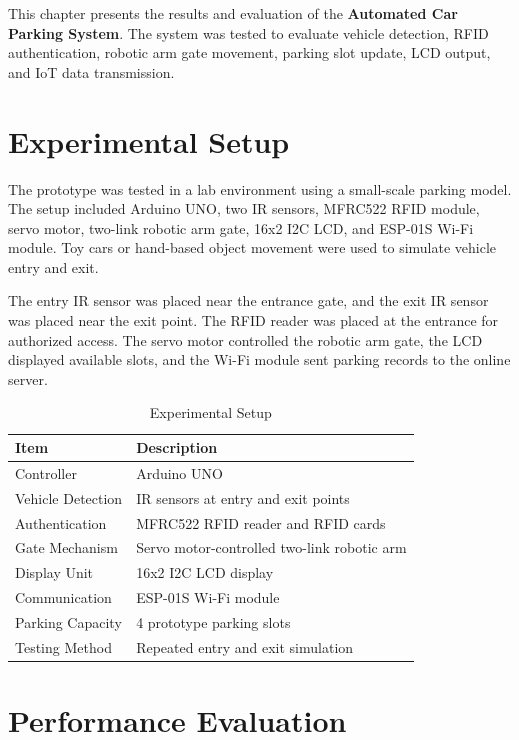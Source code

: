 
\vspace{-0.8cm}

This chapter presents the results and evaluation of the \textbf{Automated Car Parking System}. The system was tested to evaluate vehicle detection, RFID authentication, robotic arm gate movement, parking slot update, LCD output, and IoT data transmission.

\section{Experimental Setup}

The prototype was tested in a lab environment using a small-scale parking model. The setup included Arduino UNO, two IR sensors, MFRC522 RFID module, servo motor, two-link robotic arm gate, 16x2 I2C LCD, and ESP-01S Wi-Fi module. Toy cars or hand-based object movement were used to simulate vehicle entry and exit.

The entry IR sensor was placed near the entrance gate, and the exit IR sensor was placed near the exit point. The RFID reader was placed at the entrance for authorized access. The servo motor controlled the robotic arm gate, the LCD displayed available slots, and the Wi-Fi module sent parking records to the online server.

\begin{table}[H]
\centering
\small
\caption{Experimental Setup}
\label{tab:experimental_setup}
\begin{tabular}{p{4cm} p{8.5cm}}
\toprule
\textbf{Item} & \textbf{Description} \\
\midrule
Controller & Arduino UNO \\
Vehicle Detection & IR sensors at entry and exit points \\
Authentication & MFRC522 RFID reader and RFID cards \\
Gate Mechanism & Servo motor-controlled two-link robotic arm \\
Display Unit & 16x2 I2C LCD display \\
Communication & ESP-01S Wi-Fi module \\
Parking Capacity & 4 prototype parking slots \\
Testing Method & Repeated entry and exit simulation \\
\bottomrule
\end{tabular}
\normalsize
\end{table}

\section{Performance Evaluation}

